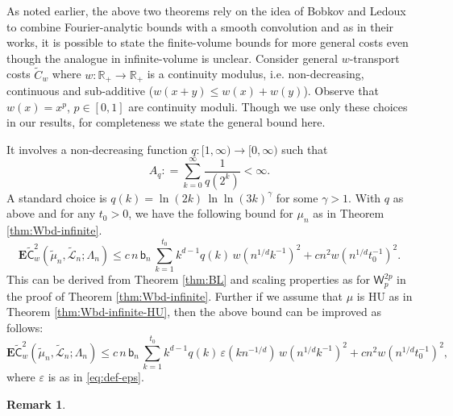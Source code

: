 \documentclass[12pt]{article}
\newtheorem{remark}{Remark}
\newcommand{\C}{ {\mathsf C}}
\newcommand{\tLeb}{\tilde{\mathcal{L}}}
\newcommand{\bn}{   \mathsf b_{n}}
\newcommand{\1}{\mathbf{1}}
\begin{document}
{{{{%
{As noted earlier, the above two theorems rely on the idea  of Bobkov and Ledoux  to combine Fourier-analytic bounds with a smooth convolution \cite{bobkov2020transport,bobkov2021simple,bobkov2024correction} and as in their works, it is possible to state the finite-volume bounds for more general costs even though the analogue in infinite-volume is unclear.}
Consider general $w$-transport costs $\tilde{C}_w$ where $w:\mathbb{R}_{  + }\to \mathbb{R}_{  + }$ is a continuity modulus, i.e. non-decreasing, continuous and sub-additive ($w(x+y) \leq w(x) + w(y)$). Observe that $w(x) = x^p$, $p \in [0,1]$ are continuity moduli. Though we use only these choices in our results, for completeness we state the general bound here.

It involves a non-decreasing function $q : [1,\infty) \to [0,\infty)$  such that
%
$$A_{q}: = \sum_{k=0}^{\infty}\frac{1}{q(2^k)} < \infty.$$
%
A standard choice is $q(k) = \ln(2k) \, \ln \ln(3k)^{\gamma}$ for some $ \gamma >1$. With $q$ as above and for any $t_0 > 0$, we have the following bound for $\mu_n$ as in Theorem \ref{thm:Wbd-infinite}.
%
$$ \mathbf{E}\widetilde{\C}_{w}^{2}(\tilde \mu _{n},\tLeb_{n};\Lambda_n) \leq c \, n \, \bn \, \sum_{k=1}^{t_0} k^{d-1} q(k) \, w(n^{1/d}k^{-1})^{2} +  cn^2 w(n^{1/d}t_0^{-1})^{2}.$$
%
This can be derived from Theorem \ref{thm:BL} and scaling properties as for $\mathsf{W}_{p}^{2p}$ in the proof of Theorem \ref{thm:Wbd-infinite}.
Further if we assume that $\mu$ is HU as in Theorem \ref{thm:Wbd-infinite-HU}, then the above bound can be improved as follows:
%
$$ \mathbf{E}\widetilde{\C}_{w}^{2}(\tilde \mu _{n},\tLeb_{n};\Lambda_n) \leq c \, n \, \bn \, \sum_{k=1}^{t_0} k^{d-1}q(k)\, \varepsilon(kn^{-1/d})\, w(n^{1/d}k^{-1})^{2} +  cn^2 w(n^{1/d}t_0^{-1})^{2},$$
%
where $\varepsilon$ is as in \eqref{eq:def-eps}.

\begin{remark}\label{rk:var-eps-repulsive}


\end{remark}}}}}
\end{document}
